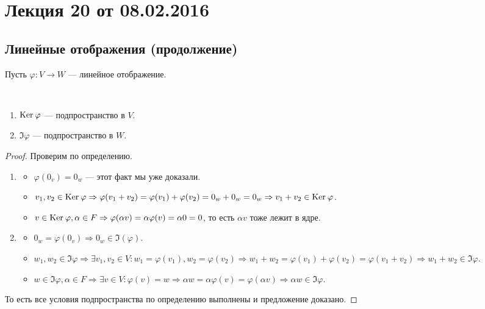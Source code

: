 


\renewcommand{\phi}{\varphi}

\section{Лекция 20 от 08.02.2016}

\subsection{Линейные отображения (продолжение)}
Пусть $\phi\colon V \rightarrow W$ --- линейное отображение.

\begin{Suggestion}\
	\begin{enumerate}
		\item $\Ker \phi$ --- подпространство в $V$.
		\item $\Im \phi$ --- подпространство в $W$.
		
	\end{enumerate}
\end{Suggestion}

\begin{proof}
    Проверим по определению.
    \begin{enumerate}
        \item \begin{itemize}
            \item $\phi(0_v) = 0_w$ --- этот факт мы уже доказали.
            \item $v_1, v_2 \in \Ker \phi \Rightarrow \phi(v_1+v_2) = \phi(v_1) + \phi(v_2) = 0_w + 0_w = 0_w \Rightarrow v_1+v_2 \in \Ker \phi$.
            \item $v \in \Ker \phi, \alpha \in F \Rightarrow \phi(\alpha v) = \alpha \phi(v) = \alpha 0 = 0$, то есть $\alpha v$ тоже лежит в ядре.
        \end{itemize}
        \item \begin{itemize}
            \item $0_w = \phi(0_v) \Rightarrow 0_w \in \Im(\phi)$.
            \item $w_1, w_2 \in \Im \phi \Rightarrow \exists v_1, v_2 \in V\colon w_1 = \phi(v_1), w_2 = \phi(v_2) \Rightarrow w_1 + w_2 = \phi(v_1) + \phi(v_2) = \phi(v_1 + v_2) \Rightarrow w_1 + w_2 \in \Im \phi$.
            \item $w \in \Im \phi, \alpha \in F \Rightarrow \exists v \in V \colon \phi(v) = w \Rightarrow \alpha w = \alpha \phi(v) = \phi(\alpha v) \Rightarrow \alpha w \in \Im \phi$.
            
        \end{itemize}
    \end{enumerate}
    То есть все условия подпространства по определению выполнены и предложение доказано.
\end{proof}

